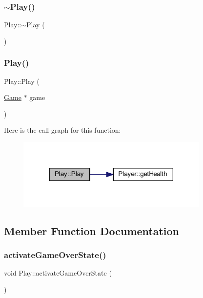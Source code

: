 \subsubsection{\texorpdfstring{$\sim$\+Play()}{~Play()}}
{\footnotesize\ttfamily Play\+::$\sim$\+Play (\begin{DoxyParamCaption}{ }\end{DoxyParamCaption})}

\mbox{\label{class_play_a84bc1e86dc4368356228523315d4dac9}} 
\subsubsection{\texorpdfstring{Play()}{Play()}}
{\footnotesize\ttfamily Play\+::\+Play (\begin{DoxyParamCaption}\item[{\hyperlink{class_game}{Game} $\ast$}]{game }\end{DoxyParamCaption})}

Here is the call graph for this function\+:
\nopagebreak
\begin{figure}[H]
\begin{center}
\leavevmode
\includegraphics[width=270pt]{class_play_a84bc1e86dc4368356228523315d4dac9_cgraph}
\end{center}
\end{figure}


\subsection{Member Function Documentation}
\mbox{\label{class_play_ab99107a51dbbc3b2f5ef9a9549944574}} 
\subsubsection{\texorpdfstring{activate\+Game\+Over\+State()}{activateGameOverState()}}
{\footnotesize\ttfamily void Play\+::activate\+Game\+Over\+State (\begin{DoxyParamCaption}{ }\end{DoxyParamCaption})}

